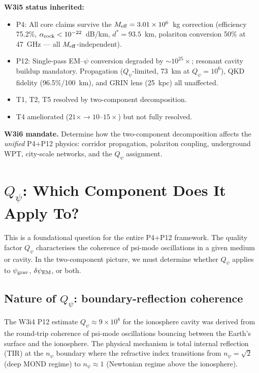\documentclass[11pt]{article}
\newcommand{\ee}[1]{\times 10^{#1}}
\newcommand{\psigrav}{\psi_{\rm grav}}
\newcommand{\dpsiEM}{\delta\psi_{\rm EM}}
\newcommand{\Meff}{M_{\rm eff}}
\newcommand{\alpharock}{\alpha_{\rm rock}}
\newcommand{\Qpsi}{Q_\psi}
\newcommand{\npsi}{n_\psi}
\begin{document}
\noindent\textbf{W3i5 status inherited:}
\begin{itemize}[nosep]
  \item P4: All core claims survive the $\Meff = 3.01\ee{6}$~kg correction
    (efficiency 75.2\%, $\alpharock < 10^{-22}$~dB/km, $d^* = 93.5$~km,
    polariton conversion 50\% at 47~GHz --- all $\Meff$-independent).
  \item P12: Single-pass EM--$\psi$ conversion degraded by $\sim 10^{25}\times$;
    resonant cavity buildup mandatory. Propagation ($\Qpsi$-limited, 73~km at
    $\Qpsi = 10^6$), QKD fidelity (96.5\%/100~km), and GRIN lens (25~kpc)
    all unaffected.
  \item T1, T2, T5 resolved by two-component decomposition.
  \item T4 ameliorated ($21\times \to 10$--$15\times$) but not fully resolved.
\end{itemize}

\noindent\textbf{W3i6 mandate.} Determine how the two-component decomposition
affects the \emph{unified} P4+P12 physics: corridor propagation, polariton
coupling, underground WPT, city-scale networks, and the $\Qpsi$ assignment.

\section{$\Qpsi$: Which Component Does It Apply To?}
\label{sec:Qpsi-assignment}

This is a foundational question for the entire P4+P12 framework. The quality
factor $\Qpsi$ characterises the coherence of psi-mode oscillations in a
given medium or cavity. In the two-component picture, we must determine
whether $\Qpsi$ applies to $\psigrav$, $\dpsiEM$, or both.

\subsection{Nature of $\Qpsi$: boundary-reflection coherence}

The W3i4 P12 estimate $\Qpsi \approx 9\ee{8}$ for the ionosphere cavity
was derived from the round-trip coherence of psi-mode oscillations bouncing
between the Earth's surface and the ionosphere. The physical mechanism is
total internal reflection (TIR) at the $\npsi$ boundary where the refractive
index transitions from $\npsi = \sqrt{2}$ (deep MOND regime) to $\npsi \approx 1$
(Newtonian regime above the ionosphere).
\end{document}
